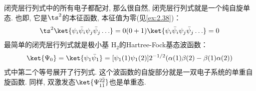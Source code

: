 闭壳层行列式中的所有电子都配对, 
那么很自然, 
闭壳层行列式就是一个纯自旋单态. 
也即, 
它是$\ts^2$的本征函数, 
本征值为零(见\autoref{ex:2.38})：
\begin{align}\label{eq:2.256}
\ts^2\ket{\psi_i\bar{\psi}_i\psi_j\bar{\psi}_j\ldots} = 0(0+1)\ket{\psi_i\bar{\psi}_i\psi_j\bar{\psi}_j\ldots} = 0
\end{align}
最简单的闭壳层行列式就是{极小基 $\mathrm{H}_2$}的Hartree-Fock基态波函数：
\begin{align}\label{eq:2.257}
\ket{\Psi_0} = \ket{\psi_1\bar{\psi}_1} = [\psi_1(1)\psi_1(2)]2^{-1/2}(\alpha(1)\beta(2) - \beta(1)\alpha(2))
\end{align}
式中第二个等号展开了行列式. 
这个波函数的自旋部分就是一双电子系统的单重自旋函数. 
同样, 
双激发态$\ket{\Psi_{1\bar{1}}^{2\bar{2}}}$也是单重态.


